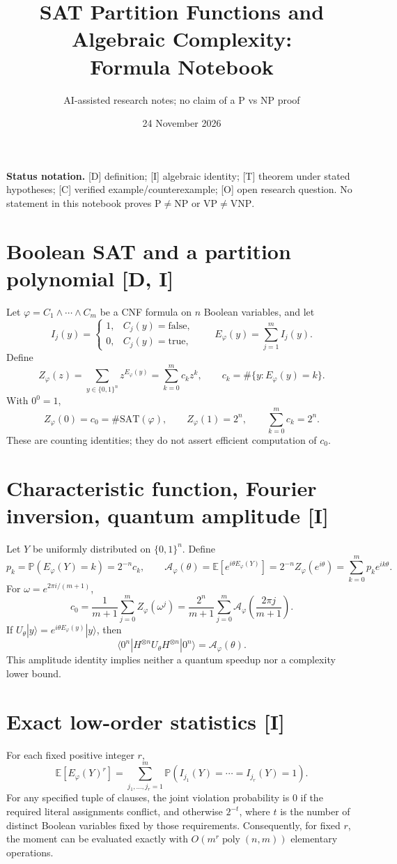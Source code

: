 \documentclass[11pt]{article}
\title{SAT Partition Functions and Algebraic Complexity:\\Formula Notebook}
\author{AI-assisted research notes; no claim of a P vs NP proof}
\date{24 November 2026}
\newcommand{\E}{\mathbb{E}}
\newcommand{\Prb}{\mathbb{P}}
\newcommand{\SAT}{\mathrm{SAT}}
\newcommand{\VNP}{\mathrm{VNP}}
\newcommand{\VP}{\mathrm{VP}}
\begin{document}
\maketitle

\noindent
\textbf{Status notation.}
[D] definition; [I] algebraic identity; [T] theorem under stated hypotheses;
[C] verified example/counterexample; [O] open research question.
No statement in this notebook proves $\mathrm{P}\ne\mathrm{NP}$ or $\VP\ne\VNP$.

\section{Boolean SAT and a partition polynomial [D, I]}
Let $\varphi=C_1\land\cdots\land C_m$ be a CNF formula
on $n$ Boolean variables, and let
\[
I_j(y)=
\begin{cases}
1,&C_j(y)=\mathrm{false},\\
0,&C_j(y)=\mathrm{true},
\end{cases}
\qquad
E_\varphi(y)=\sum_{j=1}^{m}I_j(y).
\]
Define
\[
Z_\varphi(z)=\sum_{y\in\{0,1\}^{n}}z^{E_\varphi(y)}
=\sum_{k=0}^{m}c_kz^k,\qquad
c_k=\#\{y:E_\varphi(y)=k\}.
\]
With $0^0=1$,
\[
Z_\varphi(0)=c_0=\#\SAT(\varphi),\qquad
Z_\varphi(1)=2^n,\qquad
\sum_{k=0}^{m}c_k=2^n.
\]
These are counting identities; they do not assert efficient
computation of $c_0$.

\section{Characteristic function, Fourier inversion, quantum amplitude [I]}
Let $Y$ be uniformly distributed on $\{0,1\}^n$. Define
\[
p_k=\Prb(E_\varphi(Y)=k)=2^{-n}c_k,
\qquad
\mathcal{A}_\varphi(\theta)
=\E[e^{i\theta E_\varphi(Y)}]
=2^{-n}Z_\varphi(e^{i\theta})
=\sum_{k=0}^{m}p_ke^{ik\theta}.
\]
For $\omega=e^{2\pi i/(m+1)}$,
\[
c_0=\frac{1}{m+1}\sum_{j=0}^{m}Z_\varphi(\omega^j)
=\frac{2^n}{m+1}\sum_{j=0}^{m}
\mathcal{A}_\varphi\!\left(\frac{2\pi j}{m+1}\right).
\]
If $U_\theta|y\rangle=e^{i\theta E_\varphi(y)}|y\rangle$,
then
\[
\langle 0^n|H^{\otimes n}U_\theta H^{\otimes n}|0^n\rangle
=\mathcal{A}_\varphi(\theta).
\]
This amplitude identity implies neither a quantum speedup nor a
complexity lower bound.

\section{Exact low-order statistics [I]}
For each fixed positive integer $r$,
\[
\E[E_\varphi(Y)^r]
=\sum_{j_1,\ldots,j_r=1}^{m}
\Prb(I_{j_1}(Y)=\cdots=I_{j_r}(Y)=1).
\]
For any specified tuple of clauses, the joint violation
probability is $0$ if the required literal assignments conflict,
and otherwise $2^{-t}$, where $t$ is the number of distinct
Boolean variables fixed by those requirements.
Consequently, for fixed $r$, the moment can be evaluated exactly
with $O(m^r\operatorname{poly}(n,m))$ elementary operations.
\end{document}
